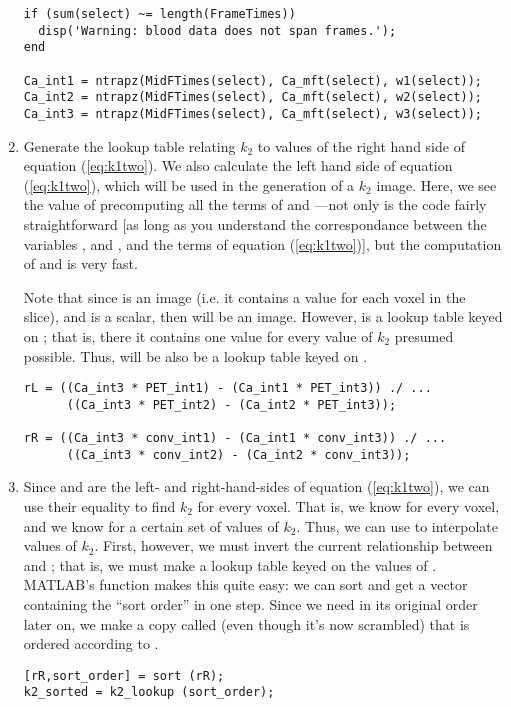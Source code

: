 \begin{enumerate}
\begin{verbatim}
if (sum(select) ~= length(FrameTimes))
  disp('Warning: blood data does not span frames.');
end
  
Ca_int1 = ntrapz(MidFTimes(select), Ca_mft(select), w1(select));
Ca_int2 = ntrapz(MidFTimes(select), Ca_mft(select), w2(select));
Ca_int3 = ntrapz(MidFTimes(select), Ca_mft(select), w3(select));
\end{verbatim}

\item Generate the lookup table relating $k_2$ to values of the right
hand side of equation (\ref{eq:k1two}).  We also calculate the left
hand side of equation (\ref{eq:k1two}), which will be used in the
generation of a $k_2$ image.  Here, we see the value of precomputing
all the terms of  and ---not only is the code fairly
straightforward [as long as you understand the correspondance between
the variables ,  and
, and the terms of equation (\ref{eq:k1two})],
but the computation of  and  is very fast.

Note that since  is an image (i.e. it contains
a value for each voxel in the slice), and  is a
scalar, then  will be an image.  However, 
 is a lookup table keyed on
; that is, there it contains one value for every
value of $k_2$ presumed possible.  Thus,  will be also be a
lookup table keyed on .
\begin{verbatim}
rL = ((Ca_int3 * PET_int1) - (Ca_int1 * PET_int3)) ./ ...
      ((Ca_int3 * PET_int2) - (Ca_int2 * PET_int3));

rR = ((Ca_int3 * conv_int1) - (Ca_int1 * conv_int3)) ./ ...
      ((Ca_int3 * conv_int2) - (Ca_int2 * conv_int3));
\end{verbatim}

\item Since  and  are the left- and right-hand-sides
  of equation (\ref{eq:k1two}), we can use their equality to find
  $k_2$ for every voxel.  That is, we know  for every voxel,
  and we know  for a certain set of values of $k_2$.  Thus,
  we can use  to interpolate values of $k_2$.  First,
  however, we must invert the current relationship between
   and ; that is, we must make
   a lookup table keyed on the values of .
  MATLAB's  function makes this quite easy: we can sort
   and get a vector containing the ``sort order'' in one
  step.  Since we need  in its original order later
  on, we make a copy called  (even though it's now
  scrambled) that is ordered according to .
\begin{verbatim}
[rR,sort_order] = sort (rR);
k2_sorted = k2_lookup (sort_order);
\end{verbatim}


\end{enumerate}
